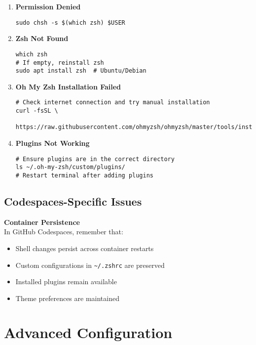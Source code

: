 \documentclass{article}
\begin{document}
\begin{enumerate}
    \item \textbf{Permission Denied}
    \begin{verbatim}
sudo chsh -s $(which zsh) $USER
    \end{verbatim}
    
    \item \textbf{Zsh Not Found}
    \begin{verbatim}
which zsh
# If empty, reinstall zsh
sudo apt install zsh  # Ubuntu/Debian
    \end{verbatim}
    
    \item \textbf{Oh My Zsh Installation Failed}
    \begin{verbatim}
# Check internet connection and try manual installation
curl -fsSL \
  https://raw.githubusercontent.com/ohmyzsh/ohmyzsh/master/tools/install.sh
    \end{verbatim}
    
    \item \textbf{Plugins Not Working}
    \begin{verbatim}
# Ensure plugins are in the correct directory
ls ~/.oh-my-zsh/custom/plugins/
# Restart terminal after adding plugins
    \end{verbatim}
\end{enumerate}

\subsection{Codespaces-Specific Issues}

\begin{warningbox}
\textbf{Container Persistence}\\
In GitHub Codespaces, remember that:
\begin{itemize}
    \item Shell changes persist across container restarts
    \item Custom configurations in \verb|~/.zshrc| are preserved
    \item Installed plugins remain available
    \item Theme preferences are maintained
\end{itemize}
\end{warningbox}

\section{Advanced Configuration}
\end{document}
